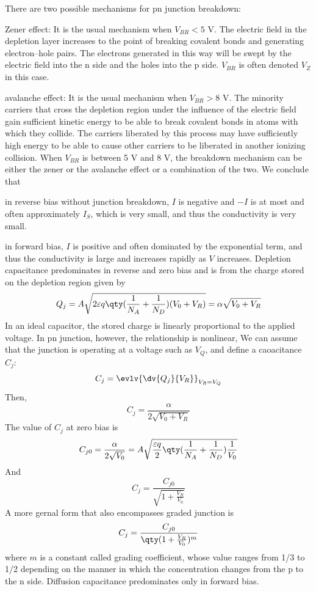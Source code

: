 \documentclass[a4paper,12pt]{article}
\begin{document}
There are two possible mechanisms for pn junction breakdown:
\bit
\item Zener effect: It is the usual mechanism when $V_{BR}<5$ V. The electric field in the depletion layer increases to the point of breaking covalent bonds and generating electron–hole pairs. The electrons generated in this way will be swept by the electric field into the n side and the holes into the p side. $V_{BR}$ is often denoted $V_Z$ in this case.
\item avalanche effect: It is the usual mechanism when $V_{BR}>8$ V. The minority carriers that cross the depletion region under the influence of the electric field gain sufficient kinetic energy to be able to break covalent bonds in atoms with which they collide. The carriers liberated by this process may have sufficiently high energy to be able to cause other carriers to be liberated in another ionizing collision.
\eit
When $V_{BR}$ is between 5 V and 8 V, the breakdown mechanism can be either the zener or the avalanche effect or a combination of the two.
We conclude that
\bit
\item in reverse bias without junction breakdown, $I$ is negative and $-I$ is at most and often approximately $I_S$, which is very small, and thus the conductivity is very small.
\item in forward bias, $I$ is positive and often dominated by the exponential term, and thus the conductivity is large and increases rapidly as $V$ increases.
\eit
{}
Depletion capacitance predominates in reverse and zero bias and is from the charge stored on the depletion region given by
\[Q_j=A\sqrt{2\varepsilon q\qty(\frac{1}{N_A}+\frac{1}{N_D})(V_0+V_R)}=\alpha\sqrt{V_0+V_R}\]
In an ideal capacitor, the stored charge is linearly proportional to the applied voltage. In pn junction, however, the relationship is nonlinear, We can assume that the junction is operating at a voltage such as $V_Q$, and define a caoacitance $C_j$:
\[C_j=\evlv{\dv{Q_j}{V_R}}_{V_R=V_Q}\]
Then,
\[C_j=\frac{\alpha}{2\sqrt{V_0+V_R}}\]
The value of $C_j$ at zero bias is
\[C_{j0}=\frac{\alpha}{2\sqrt{V_0}}=A\sqrt{\frac{\varepsilon q}{2}\qty(\frac{1}{N_A}+\frac{1}{N_D})\frac{1}{V_0}}\]
And
\[C_j=\frac{C_{j0}}{\sqrt{1+\frac{V_R}{V_0}}}\]
A more gernal form that also encompasses graded junction is
\[C_j=\frac{C_{j0}}{\qty(1+\frac{V_R}{V_0})^m}\]
where $m$ is a constant called grading coefficient, whose value ranges from 1/3 to 1/2 depending on the manner in which the concentration changes from the p to the n side.
Diffusion capacitance predominates only in forward bias.
\end{document}
